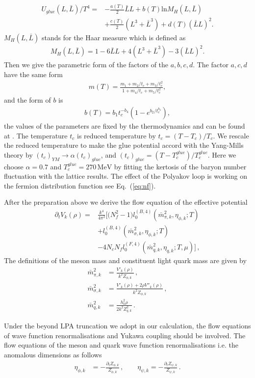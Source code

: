 \documentclass[%
reprint,
superscriptaddress,
showpacs,preprintnumbers,
 amsmath,amssymb,
 aps,
prd,
]{revtex4-1}
\def\Eq#1{Eq.~(\ref{#1})}
\begin{document}
\begin{align}
U_{glue}(L,\bar{L})/T^4=&-\frac{a(T)}{2}\bar{L}L+b(T)\mathrm{ln}M_H(L,\bar{L})\nonumber \\ 
&+\frac{c(T)}{2}(L^3+\bar{L}^3)+d(T)(\bar{L}L)^2.
\end{align}
$M_H(L,\bar{L})$ stands for the Haar measure which is defined as
\begin{align}
M_H(L,\bar{L})=1-6\bar{L}L+4(L^3+\bar{L}^3)-3(\bar{L}L)^2.
\end{align}
Then we give the parametric form of the factors of the $a,b,c,d$. The factor $a,c,d$ have the same form
\begin{align}
m(T)=\frac{m_1+m_2/t_c+m_3/t_c^2}{1+m_4/t_c+m_5/t_c^2},
\end{align}
and the form of $b$ is
\begin{align}
b(T)=b_1 t_c^{-b_4}(1-e^{b_2/t_c^{b_3}}),
\end{align}
the values of the parameters are fixed by the thermodynamics and can be found at \cite{Lo:2013hla}. The temperature $t_c$ is reduced temperature by $t_c=(T-T_c)/T_c$. We rescale the reduced temperature to make the glue potential accord with the Yang-Mills theory by $(t_c)_{YM}\rightarrow \alpha(t_c)_{glue}$, and $(t_c)_{glue}=(T-T^{glue}_c)/T^{glue}_c$. Here we choose $\alpha=0.7$ and $T^{glue}_c=270\,\mathrm{MeV}$ by fitting the kertosis of the baryon number fluctuation with the lattice results. The effect of the Polyakov loop is working on the fermion distribution function see \Eq{eq:nf}. 

\par
After the preparation above we derive the flow equation of the effective potential
\begin{align}
  \partial_t V_k(\rho)=&\frac{k^4}{4\pi^2} \bigg [\big(N^2_f-1\big) l^{(B,4)}_{0}(\bar{m}^{2}_{\pi,k},\eta_{\phi,k};T)\nonumber\\[2ex]
&+l^{(B,4)}_{0}(\bar{m}^{2}_{\sigma,k},\eta_{\phi,k};T)\nonumber\\[2ex]
&-4N_c N_f l^{(F,4)}_{0}(\bar{m}^{2}_{q,k},\eta_{q,k};T,\mu)\bigg]\,, \label{eq:flowV}
\end{align}
The definitions of the meson mass and constituent light quark mass are given by
\begin{align}
  \bar{m}^{2}_{\pi,k}&=\frac{V'_k(\rho)}{k^2Z_{\phi,k}}\,,\\[2ex]
  \bar{m}^{2}_{\sigma,k}&=\frac{V'_k(\rho)+2\rho V''_k(\rho)}{k^2 Z_{\phi,k}}\,,\\[2ex]
  \bar{m}^{2}_{q,k}&=\frac{h^{2}_{k}\rho}{2k^2Z^{2}_{q,k}}\,.
\end{align}\par
Under the beyond LPA truncation we adopt in our calculation, the flow equations of wave function renormalisations and Yukawa coupling should be involved. The flow equations of the meson and quark wave function renormalisations i.e. the anomalous dimensions as follows
\begin{align}
  \eta_{\phi,k}&=-\frac{\partial_t Z_{\phi,k}}{Z_{\phi,k}}\,,\qquad
  \eta_{\psi,k}=-\frac{\partial_t Z_{\psi,k}}{Z_{\psi,k}}\,.
\end{align}
\end{document}
